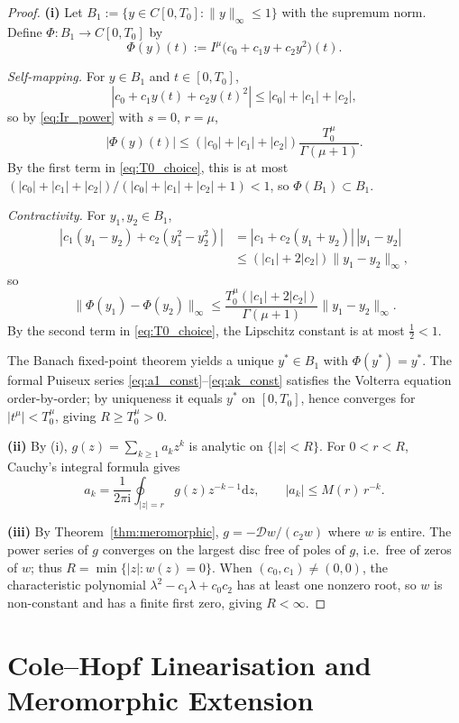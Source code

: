 \documentclass[12pt,a4paper]{amsart}
\newcommand{\dd}{\mathrm{d}}
\newcommand{\ii}{\mathrm{i}}
\newcommand{\assign}{:=}
\theoremstyle{plain}
\theoremstyle{definition}
\theoremstyle{remark}
\begin{document}
\begin{proof}
\textbf{(i)}
Let $B_1\assign\{y\in C[0,T_0]:\|y\|_\infty\le 1\}$ with the supremum norm.
Define $\Phi:B_1\to C[0,T_0]$ by
\[
  \Phi(y)(t)\assign I^{\mu}\bigl(c_0+c_1 y+c_2 y^2\bigr)(t).
\]

\emph{Self-mapping.} For $y\in B_1$ and $t\in[0,T_0]$,
\[
  |c_0+c_1 y(t)+c_2 y(t)^2|\le|c_0|+|c_1|+|c_2|,
\]
so by \eqref{eq:Ir_power} with $s=0$, $r=\mu$,
\[
  |\Phi(y)(t)|\le(|c_0|+|c_1|+|c_2|)\frac{T_0^{\mu}}{\Gamma(\mu+1)}.
\]
By the first term in \eqref{eq:T0_choice}, this is at most
$(|c_0|+|c_1|+|c_2|)/(|c_0|+|c_1|+|c_2|+1)<1$,
so $\Phi(B_1)\subset B_1$.

\emph{Contractivity.} For $y_1,y_2\in B_1$,
\begin{align*}
  |c_1(y_1-y_2)+c_2(y_1^2-y_2^2)|
  &=|c_1+c_2(y_1+y_2)|\,|y_1-y_2|\\
  &\le(|c_1|+2|c_2|)\|y_1-y_2\|_\infty,
\end{align*}
so
\[
  \|\Phi(y_1)-\Phi(y_2)\|_\infty
  \le\frac{T_0^{\mu}(|c_1|+2|c_2|)}{\Gamma(\mu+1)}\|y_1-y_2\|_\infty.
\]
By the second term in \eqref{eq:T0_choice},
the Lipschitz constant is at most $\tfrac{1}{2}<1$.

The Banach fixed-point theorem yields a unique $y^*\in B_1$ with
$\Phi(y^*)=y^*$. The formal Puiseux series \eqref{eq:a1_const}--\eqref{eq:ak_const}
satisfies the Volterra equation order-by-order; by uniqueness it equals $y^*$
on $[0,T_0]$, hence converges for $|t^{\mu}|<T_0^{\mu}$, giving
$R\ge T_0^{\mu}>0$.

\textbf{(ii)}
By (i), $g(z)=\sum_{k\ge 1}a_k z^k$ is analytic on $\{|z|<R\}$.
For $0<r<R$, Cauchy's integral formula gives
\[
  a_k=\frac{1}{2\pi\ii}\oint_{|z|=r}g(z)z^{-k-1}\dd z,\qquad
  |a_k|\le M(r)\,r^{-k}.
\]

\textbf{(iii)}
By Theorem~\ref{thm:meromorphic}, $g=-\mathcal{D}w/(c_2 w)$ where $w$ is
entire. The power series of $g$ converges on the largest disc free of poles
of $g$, i.e.\ free of zeros of $w$; thus $R=\min\{|z|:w(z)=0\}$.
When $(c_0,c_1)\ne(0,0)$, the characteristic polynomial
$\lambda^2-c_1\lambda+c_0 c_2$ has at least one nonzero root, so $w$ is
non-constant and has a finite first zero, giving $R<\infty$.
\end{proof}

\section{Cole--Hopf Linearisation and Meromorphic Extension}
\label{sec:colehopf}
\end{document}
